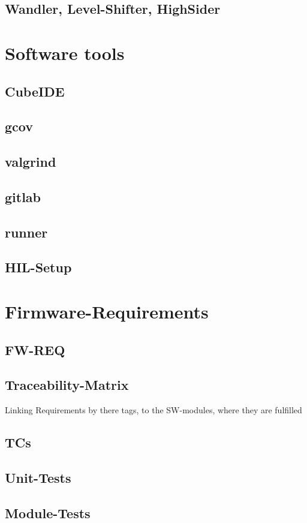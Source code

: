 		\subsection{Wandler, Level-Shifter, HighSider}

	\section{Software tools}
		\subsection{CubeIDE}
		\subsection{gcov}
		\subsection{valgrind}
		\subsection{gitlab}
		\subsection{runner}
		\subsection{HIL-Setup}
		
	\section{Firmware-Requirements}
		\subsection{FW-REQ}
		\subsection{Traceability-Matrix}
		Linking Requirements by there tags, to the SW-modules, where they are fulfilled
		\subsection{TCs}
		\subsection{Unit-Tests}
		\subsection{Module-Tests}
